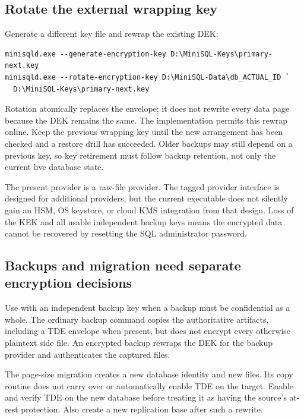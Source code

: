 
\subsection{Rotate the external wrapping key}

Generate a different key file and rewrap the existing DEK:

\begin{lstlisting}
minisqld.exe --generate-encryption-key D:\MiniSQL-Keys\primary-next.key
minisqld.exe --rotate-encryption-key D:\MiniSQL-Data\db_ACTUAL_ID `
  D:\MiniSQL-Keys\primary-next.key
\end{lstlisting}

Rotation atomically replaces the envelope; it does not rewrite every data
page because the DEK remains the same. The implementation permits this
rewrap online. Keep the previous wrapping key until the new arrangement has
been checked and a restore drill has succeeded. Older backups may still
depend on a previous key, so key retirement must follow backup retention,
not only the current live database state.

The present provider is a raw-file provider. The tagged provider interface is
designed for additional providers, but the current executable does not
silently gain an HSM, OS keystore, or cloud KMS integration from that design.
Loss of the KEK and all usable independent backup keys means the encrypted
data cannot be recovered by resetting the SQL administrator password.

\subsection{Backups and migration need separate encryption decisions}

Use  with an independent backup key when a backup must
be confidential as a whole. The ordinary backup command copies the
authoritative artifacts, including a TDE envelope when present, but does not
encrypt every otherwise plaintext side file. An encrypted backup rewraps the
DEK for the backup provider and authenticates the captured files.

The page-size  migration creates a new database identity and
new files. Its copy routine does not carry over  or
automatically enable TDE on the target. Enable and verify TDE on the new
database before treating it as having the source's at-rest protection. Also
create a new replication base after such a rewrite.

